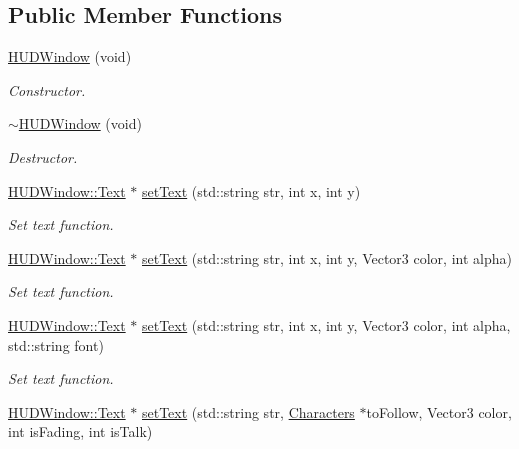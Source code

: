 \subsection*{Public Member Functions}
\begin{DoxyCompactItemize}
\item 
\hyperlink{class_h_u_d_window_a8d97402012deb77be8008cfed176fdd6}{H\+U\+D\+Window} (void)
\begin{DoxyCompactList}\small\item\em Constructor. \end{DoxyCompactList}\item 
\hyperlink{class_h_u_d_window_ac1c288c91430729735038fcefc4bcdb8}{$\sim$\+H\+U\+D\+Window} (void)
\begin{DoxyCompactList}\small\item\em Destructor. \end{DoxyCompactList}\item 
\hyperlink{class_h_u_d_window_1_1_text}{H\+U\+D\+Window\+::\+Text} $\ast$ \hyperlink{class_h_u_d_window_aedb23e2b82cc2b13ee024364deb52d64}{set\+Text} (std\+::string str, int x, int y)
\begin{DoxyCompactList}\small\item\em Set text function. \end{DoxyCompactList}\item 
\hyperlink{class_h_u_d_window_1_1_text}{H\+U\+D\+Window\+::\+Text} $\ast$ \hyperlink{class_h_u_d_window_a9ca581ceb96dd26684978140621ea468}{set\+Text} (std\+::string str, int x, int y, Vector3 color, int alpha)
\begin{DoxyCompactList}\small\item\em Set text function. \end{DoxyCompactList}\item 
\hyperlink{class_h_u_d_window_1_1_text}{H\+U\+D\+Window\+::\+Text} $\ast$ \hyperlink{class_h_u_d_window_a9a546c6c138ac863f464ec7bf606ea68}{set\+Text} (std\+::string str, int x, int y, Vector3 color, int alpha, std\+::string font)
\begin{DoxyCompactList}\small\item\em Set text function. \end{DoxyCompactList}\item 
\hyperlink{class_h_u_d_window_1_1_text}{H\+U\+D\+Window\+::\+Text} $\ast$ \hyperlink{class_h_u_d_window_a63b8e6cefedc40263fce659513e5b420}{set\+Text} (std\+::string str, \hyperlink{class_characters}{Characters} $\ast$to\+Follow, Vector3 color, int is\+Fading, int is\+Talk)

\end{DoxyCompactItemize}
